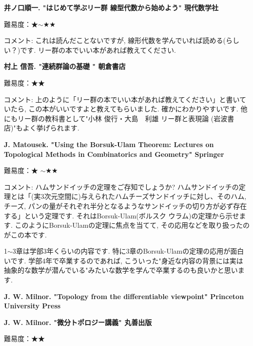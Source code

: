 \textbf{井ノ口順一. "はじめて学ぶリー群 線型代数から始めよう" 現代数学社}  　\vspace{-6pt} 

難易度：★$\sim$★★ 　\vspace{-6pt} 

コメント: これは読んだことないですが, 線形代数を学んでいれば読める(らしい？)です. リー群の本でいい本があれば教えてください. 
\vspace{8pt}

\textbf{村上 信吾. "連続群論の基礎 " 朝倉書店}  　\vspace{-6pt} 

難易度：★★ 　\vspace{-6pt} 

コメント: 上のように「リー群の本でいい本があれば教えてください」と書いていたら, この本がいいですよと教えてもらいました. 確かにわかりやすいです. 他にもリー群の教科書として"小林 俊行・大島　利雄 リー群と表現論 (岩波書店)"もよく挙げられます.
\vspace{8pt}

\textbf{J. Matousek. "Using the Borsuk-Ulam Theorem: Lectures on Topological Methods in Combinatorics and Geometry" Springer}  　\vspace{-6pt} 

難易度：★ $\sim$★★\vspace{-6pt} 

コメント: ハムサンドイッチの定理をご存知でしょうか? ハムサンドイッチの定理とは「(実3次元空間に)与えられたハムチーズサンドイッチに対し、そのハム, チーズ, パンの量がそれぞれ半分となるようなサンドイッチの切り方が必ず存在する」という定理です. それはBorsuk-Ulam(ボルスク ウラム)の定理から示せます. 
このようにBorsuk-Ulamの定理に焦点を当てて, その応用などを取り扱ったのがこの本です. 

1$\sim$3章は学部3年くらいの内容です. 特に3章のBorsuk-Ulamの定理の応用が面白いです. 学部4年で卒業するのであれば, こういった"身近な内容の背景には実は抽象的な数学が潜んでいる"みたいな数学を学んで卒業するのも良いかと思います. 
\vspace{8pt}

\textbf{J. W. Milnor. "Topology from the differentiable viewpoint" Princeton University Press}  　\vspace{-6pt} 

\textbf{J. W. Milnor. "微分トポロジー講義" 丸善出版}  　\vspace{-6pt} 

難易度：★★ \vspace{-6pt} 


